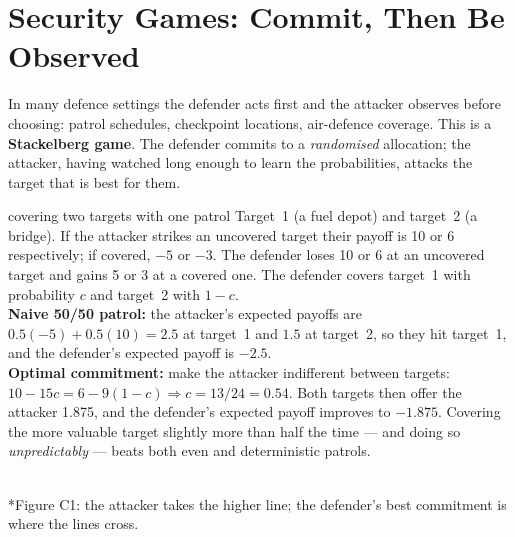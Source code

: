 \documentclass[11pt]{article}
\begin{document}
\section{Security Games: Commit, Then Be Observed}
In many defence settings the defender acts first and the attacker observes before choosing: patrol schedules, checkpoint locations, air-defence coverage. This is a \textbf{Stackelberg game}. The defender commits to a \emph{randomised} allocation; the attacker, having watched long enough to learn the probabilities, attacks the target that is best for them.
\begin{example}{covering two targets with one patrol}
Target~1 (a fuel depot) and target~2 (a bridge). If the attacker strikes an uncovered target their payoff is 10 or 6 respectively; if covered, $-5$ or $-3$. The defender loses 10 or 6 at an uncovered target and gains 5 or 3 at a covered one. The defender covers target~1 with probability $c$ and target~2 with $1-c$.\\[2pt]
\textbf{Naive 50/50 patrol:} the attacker's expected payoffs are $0.5(-5)+0.5(10)=2.5$ at target~1 and $1.5$ at target~2, so they hit target~1, and the defender's expected payoff is $-2.5$.\\
\textbf{Optimal commitment:} make the attacker indifferent between targets: $10-15c=6-9(1-c)\Rightarrow c=13/24=0.54$. Both targets then offer the attacker 1.875, and the defender's expected payoff improves to $-1.875$. Covering the more valuable target slightly more than half the time --- and doing so \emph{unpredictably} --- beats both even and deterministic patrols.
\end{example}
\begin{center}\\*{\small\color{GreyN}Figure C1: the attacker takes the higher line; the defender's best commitment is where the lines cross.}\end{center}
\end{document}

